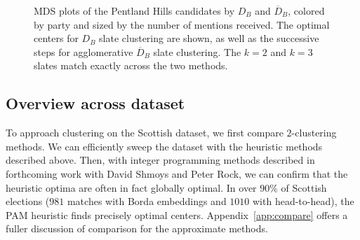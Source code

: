 \documentclass{amsart}
\newcommand{\dcand}{D_B}
\newcommand{\dcandbar}{\overline{D}_B}
\theoremstyle{plain}
\theoremstyle{definition}
\theoremstyle{remark}
\begin{document}
\begin{figure}[bht!]

\caption{MDS plots of the Pentland Hills candidates by $\dcand$ and $\dcandbar$, colored by party and sized by the number of mentions received. The optimal centers for $\dcand$ slate clustering are shown, as well as the successive steps for agglomerative $\dcandbar$ slate clustering.  The $k=2$ and $k=3$ slates match exactly across the two methods.}\label{fig:agglom}
\end{figure}

\FloatBarrier
\subsection{Overview across dataset}
\label{subsec:scottish-overview}





To approach clustering on the Scottish dataset, we first compare $2$-clustering methods.  We can efficiently sweep the dataset with the heuristic methods described above.%
Then, with integer programming methods described in forthcoming work  with David Shmoys and Peter Rock, we can confirm that the heuristic optima are often in fact globally optimal.  In over $90\%$ of Scottish elections ($981$ matches with Borda embeddings and $1010$ with head-to-head), the PAM heuristic finds precisely optimal centers.  
Appendix~\ref{app:compare} offers a fuller discussion of comparison for the approximate methods.
\end{document}
